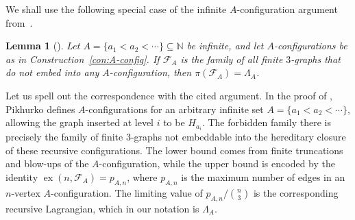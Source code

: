 \documentclass[10pt]{article}
\numberwithin{equation}{section}
\newtheorem{lemma}[theorem]{Lemma}
\DeclareMathOperator{\ex}{ex}
\newcommand{\N}{\mathbb{N}}
\begin{document}
We shall use the following special case of the infinite $A$-configuration argument from~\cite{Pikhurko2014}.

\begin{lemma}[{\cite[Proof of Theorem~2, p.~448]{Pikhurko2014}}]
\label{lem:A-config}
Let $A=\{a_1<a_2<\cdots\}\subseteq\N$ be infinite, and let $A$-configurations be as in Construction~\ref{con:A-config}. If $\mathcal F_A$ is the family of all finite $3$-graphs that do not embed into any $A$-configuration, then $\pi(\mathcal F_A)=\Lambda_A$.
\end{lemma}

Let us spell out the correspondence with the cited argument. In the proof of \cite[Theorem~2]{Pikhurko2014}, Pikhurko defines $A$-configurations for an arbitrary infinite set $A=\{a_1<a_2<\cdots\}$, allowing the graph inserted at level $i$ to be $H_{a_i}$. The forbidden family there is precisely the family of finite $3$-graphs not embeddable into the hereditary closure of these recursive configurations. The lower bound comes from finite truncations and blow-ups of the $A$-configuration, while the upper bound is encoded by the identity $\ex(n,\mathcal F_A)=p_{A,n}$, where $p_{A,n}$ is the maximum number of edges in an $n$-vertex $A$-configuration. The limiting value of $p_{A,n}/\binom n3$ is the corresponding recursive Lagrangian, which in our notation is $\Lambda_A$.
\end{document}
